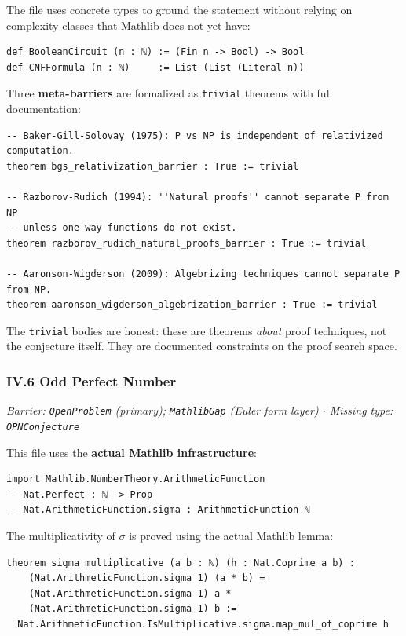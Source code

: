 \documentclass[12pt,a4paper]{article}
\begin{document}
The file uses concrete types to ground the statement without relying on complexity classes that Mathlib does not yet have:

\begin{lstlisting}[language=lean]
def BooleanCircuit (n : ℕ) := (Fin n -> Bool) -> Bool
def CNFFormula (n : ℕ)     := List (List (Literal n))
\end{lstlisting}

Three \textbf{meta-barriers} are formalized as \texttt{trivial} theorems with full documentation:

\begin{lstlisting}[language=lean]
-- Baker-Gill-Solovay (1975): P vs NP is independent of relativized computation.
theorem bgs_relativization_barrier : True := trivial

-- Razborov-Rudich (1994): ''Natural proofs'' cannot separate P from NP
-- unless one-way functions do not exist.
theorem razborov_rudich_natural_proofs_barrier : True := trivial

-- Aaronson-Wigderson (2009): Algebrizing techniques cannot separate P from NP.
theorem aaronson_wigderson_algebrization_barrier : True := trivial
\end{lstlisting}

The \texttt{trivial} bodies are honest: these are theorems \emph{about} proof techniques, not the conjecture itself. They are documented constraints on the proof search space.

\subsubsection{IV.6 Odd Perfect Number}

\emph{Barrier: \texttt{OpenProblem} (primary); \texttt{MathlibGap} (Euler form layer) $\cdot$ Missing type: \texttt{OPNConjecture}}

This file uses the \textbf{actual Mathlib infrastructure}:

\begin{lstlisting}[language=lean]
import Mathlib.NumberTheory.ArithmeticFunction
-- Nat.Perfect : ℕ -> Prop
-- Nat.ArithmeticFunction.sigma : ArithmeticFunction ℕ
\end{lstlisting}

The multiplicativity of $\sigma$ is proved using the actual Mathlib lemma:

\begin{lstlisting}[language=lean]
theorem sigma_multiplicative (a b : ℕ) (h : Nat.Coprime a b) :
    (Nat.ArithmeticFunction.sigma 1) (a * b) =
    (Nat.ArithmeticFunction.sigma 1) a *
    (Nat.ArithmeticFunction.sigma 1) b :=
  Nat.ArithmeticFunction.IsMultiplicative.sigma.map_mul_of_coprime h
\end{lstlisting}
\end{document}
